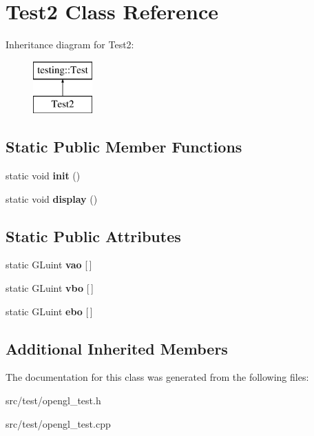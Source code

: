 \hypertarget{class_test2}{}\section{Test2 Class Reference}
\label{class_test2}
Inheritance diagram for Test2\+:\begin{figure}[H]
\begin{center}
\leavevmode
\includegraphics[height=2.000000cm]{class_test2}
\end{center}
\end{figure}
\subsection*{Static Public Member Functions}
\begin{DoxyCompactItemize}
\item 
\hypertarget{class_test2_afa0c32c3dd75a5645c9ce931c5cf316f}{}static void {\bfseries init} ()\label{class_test2_afa0c32c3dd75a5645c9ce931c5cf316f}

\item 
\hypertarget{class_test2_a7455e00e9ada90a99f15b0a938fa96c0}{}static void {\bfseries display} ()\label{class_test2_a7455e00e9ada90a99f15b0a938fa96c0}

\end{DoxyCompactItemize}
\subsection*{Static Public Attributes}
\begin{DoxyCompactItemize}
\item 
\hypertarget{class_test2_abd780937ac6b4ace7cd10db14e143b40}{}static G\+Luint {\bfseries vao} \mbox{[}$\,$\mbox{]}\label{class_test2_abd780937ac6b4ace7cd10db14e143b40}

\item 
\hypertarget{class_test2_ac4b0615887205ec2597f17b1eb28c259}{}static G\+Luint {\bfseries vbo} \mbox{[}$\,$\mbox{]}\label{class_test2_ac4b0615887205ec2597f17b1eb28c259}

\item 
\hypertarget{class_test2_a0f31cd9f0934e6463deb78b17e2f9d8d}{}static G\+Luint {\bfseries ebo} \mbox{[}$\,$\mbox{]}\label{class_test2_a0f31cd9f0934e6463deb78b17e2f9d8d}

\end{DoxyCompactItemize}
\subsection*{Additional Inherited Members}


The documentation for this class was generated from the following files\+:\begin{DoxyCompactItemize}
\item 
src/test/opengl\+\_\+test.\+h\item 
src/test/opengl\+\_\+test.\+cpp\end{DoxyCompactItemize}
